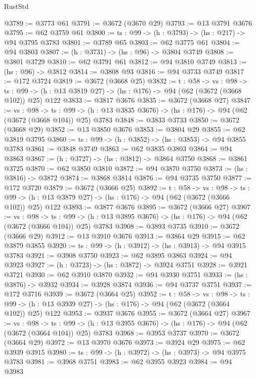 \begin{lexlean}{RustStd}
\begin{coremodule}
{\begin{coremodule}
{{{{{{{{{{{@3789 := @3773 @61
@3791 := @3672 (@3670 @29)
@3793 := @13 @3791 @3676
@3795 := @62 @3759 @61
@3800 := {ts : @99} -> (h : @3793) -> (hs : @217) -> @94 @3795 @3783
@3801 := @3789 @65
@3803 := @62 @3775 @61
@3804 := @94 @3803
@3807 := (h : @3731) -> (hs : @96) -> @3804 @3749
@3808 := @3801 @3729
@3810 := @62 @3791 @61
@3812 := @94 @3810 @3749
@3813 := (hs : @96) -> @3812
@3814 := @3808 @93
@3816 := @94 @3733 @3749
@3817 := @172 @3724
@3819 := @3672 (@3668 @25)
@3832 := {t : @58} ->
  {vs : @98} ->
  {ts : @99} -> (h : @13 @3819 @27) -> (hs : @176) -> @94 (@62 (@3672 (@3668 @102)) @25) @122
@3833 := @3817 @3676
@3835 := @3672 (@3668 @27)
@3847 := {vs : @98} ->
  {ts : @99} -> (h : @13 @3835 @3676) -> (hs : @176) -> @94 (@62 (@3672 (@3668 @104)) @25) @3783
@3848 := @3833 @3733
@3850 := @3672 (@3668 @29)
@3852 := @13 @3850 @3676
@3853 := @3804 @29
@3855 := @62 @3819 @3795
@3860 := {ts : @99} -> (h : @3852) -> (hs : @3853) -> @94 @3855 @3783
@3861 := @3848 @3749
@3863 := @62 @3835 @3803
@3864 := @94 @3863
@3867 := (h : @3727) -> (hs : @3812) -> @3864 @3750
@3868 := @3861 @3725
@3870 := @62 @3850 @3810
@3872 := @94 @3870 @3750
@3873 := (hs : @3816) -> @3872
@3874 := @3868 @3814
@3876 := @94 @3735 @3750
@3877 := @172 @3720
@3879 := @3672 (@3666 @25)
@3892 := {t : @58} ->
  {vs : @98} ->
  {ts : @99} -> (h : @13 @3879 @27) -> (hs : @176) -> @94 (@62 (@3672 (@3666 @102)) @25) @122
@3893 := @3877 @3676
@3895 := @3672 (@3666 @27)
@3907 := {vs : @98} ->
  {ts : @99} -> (h : @13 @3895 @3676) -> (hs : @176) -> @94 (@62 (@3672 (@3666 @104)) @25) @3783
@3908 := @3893 @3735
@3910 := @3672 (@3666 @29)
@3912 := @13 @3910 @3676
@3913 := @3864 @29
@3915 := @62 @3879 @3855
@3920 := {ts : @99} -> (h : @3912) -> (hs : @3913) -> @94 @3915 @3783
@3921 := @3908 @3750
@3923 := @62 @3895 @3863
@3924 := @94 @3923
@3927 := (h : @3723) -> (hs : @3872) -> @3924 @3751
@3928 := @3921 @3721
@3930 := @62 @3910 @3870
@3932 := @94 @3930 @3751
@3933 := (hs : @3876) -> @3932
@3934 := @3928 @3874
@3936 := @94 @3737 @3751
@3937 := @172 @3716
@3939 := @3672 (@3664 @25)
@3952 := {t : @58} ->
  {vs : @98} ->
  {ts : @99} -> (h : @13 @3939 @27) -> (hs : @176) -> @94 (@62 (@3672 (@3664 @102)) @25) @122
@3953 := @3937 @3676
@3955 := @3672 (@3664 @27)
@3967 := {vs : @98} ->
  {ts : @99} -> (h : @13 @3955 @3676) -> (hs : @176) -> @94 (@62 (@3672 (@3664 @104)) @25) @3783
@3968 := @3953 @3737
@3970 := @3672 (@3664 @29)
@3972 := @13 @3970 @3676
@3973 := @3924 @29
@3975 := @62 @3939 @3915
@3980 := {ts : @99} -> (h : @3972) -> (hs : @3973) -> @94 @3975 @3783
@3981 := @3968 @3751
@3983 := @62 @3955 @3923
@3984 := @94 @3983
}}}}}}}}}}}
\end{coremodule}}
\end{coremodule}
\end{lexlean}
